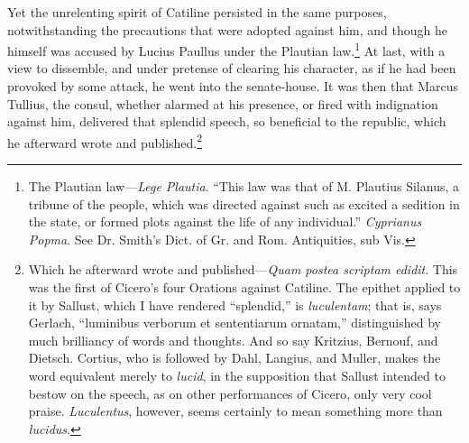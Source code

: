 Yet the unrelenting spirit of Catiline persisted in the same purposes,
notwithstanding the precautions that were adopted against him, and
though he himself was accused by Lucius Paullus under the Plautian
law.\footnote{The Plautian law—\emph{Lege Plautia}. ``This law was that of M.
Plautius Silanus, a tribune of the people, which was directed against
such as excited a sedition in the state, or formed plots against the
life of any individual.'' \emph{Cyprianus Popma}. See Dr. Smith's Dict. of
Gr. and Rom. Antiquities, sub Vis.} At last, with a view to dissemble, and under pretense of
clearing his character, as if he had been provoked by some attack, he
went into the senate-house. It was then that Marcus Tullius, the
consul, whether alarmed at his presence, or fired with indignation
against him, delivered that splendid speech, so beneficial to the
republic, which he afterward wrote and published.\footnote{Which he afterward wrote and published—\emph{Quam postea scriptam
edidit}. This was the first of Cicero's four Orations against
Catiline. The epithet applied to it by Sallust, which I have rendered
``splendid,'' is \emph{luculentam}; that is, says Gerlach, ``luminibus
verborum et sententiarum ornatam,'' distinguished by much brilliancy of
words and thoughts. And so say Kritzius, Bernouf, and Dietsch. Cortius,
who is followed by Dahl, Langius, and Muller, makes the word equivalent
merely to \emph{lucid}, in the supposition that Sallust intended to bestow
on the speech, as on other performances of Cicero, only very cool praise.
\emph{Luculentus}, however, seems certainly to mean something more than
\emph{lucidus}.}

